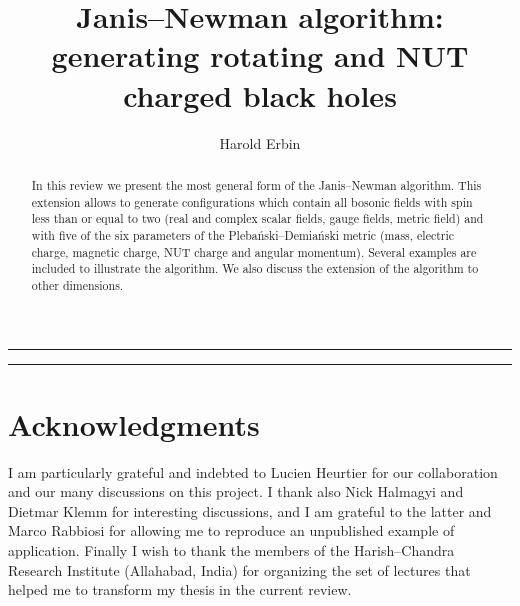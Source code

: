 \documentclass[10pt, a4paper]{article}
\title{Janis--Newman algorithm: generating rotating and NUT charged black holes}
\author[1]{Harold Erbin\email{erbin@lpt.ens.fr}}
\affil[1]{\textsc{Cnrs}, \textsc{Lptens}, École Normale Supérieure, F-75231 Paris, France}
\numberwithin{equation}{section}
\begin{document}
\maketitle


\begin{abstract} 
In this review we present the most general form of the Janis--Newman algorithm.
This extension allows to generate configurations which contain all bosonic fields with spin less than or equal to two (real and complex scalar fields, gauge fields, metric field) and with five of the six parameters of the Plebański--Demiański metric (mass, electric charge, magnetic charge, NUT charge and angular momentum).
Several examples are included to illustrate the algorithm.
We also discuss the extension of the algorithm to other dimensions.
\end{abstract}


\newpage

\hrule
{}
\tableofcontents
\bigskip
\hrule

\newpage












\section*{Acknowledgments}


I am particularly grateful and indebted to Lucien Heurtier for our collaboration and our many discussions on this project.
I thank also Nick Halmagyi and Dietmar Klemm for interesting discussions, and I am grateful to the latter and Marco Rabbiosi for allowing me to reproduce an unpublished example of application.
Finally I wish to thank the members of the Harish--Chandra Research Institute (Allahabad, India) for organizing the set of lectures that helped me to transform my thesis in the current review.


\appendix







\printbibliography[heading=bibintoc]
\end{document}
